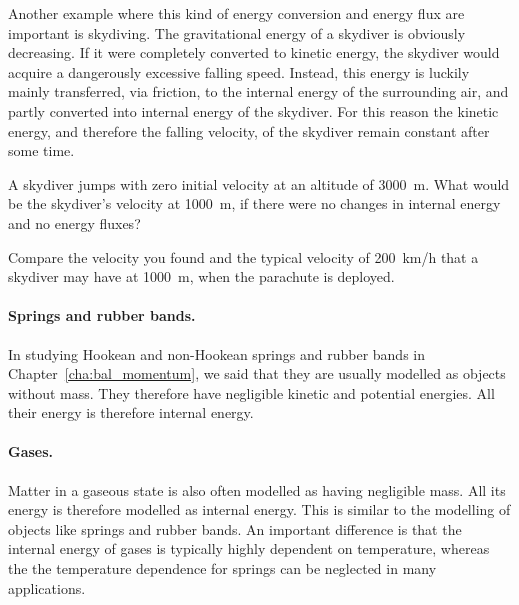 \documentclass[a4paper,12pt,%
onecolumn,oneside,%
british%
]{memoir}
\renewcommand*{\|}[1][]{\nonscript\:#1\vert\nonscript\:\mathopen{}}
\newcommand*{\chap}{Chapter}%
\begin{document}
Another example where this kind of energy conversion and energy flux are important is skydiving. The gravitational energy of a skydiver is obviously decreasing. If it were completely converted to kinetic energy, the skydiver would acquire a dangerously excessive falling speed. Instead, this energy is luckily mainly transferred, via friction, to the internal energy of the surrounding air, and partly converted into internal energy of the skydiver. For this reason the kinetic energy, and therefore the falling velocity, of the skydiver remain constant after some time.
%
%

\begin{exercise}
  A skydiver jumps with zero initial velocity at an altitude of \qty{3000}{m}. What would be the skydiver's velocity at \qty{1000}{m}, if there were no changes in internal energy and no energy fluxes?

  Compare the velocity you found and the typical velocity of \qty{200}{km/h} that a skydiver may have at \qty{1000}{m}, when the parachute is deployed.
\end{exercise}

\paragraph{Springs and rubber bands.}

In studying Hookean and non-Hookean springs and rubber bands in \chap~\ref{cha:bal_momentum}, we said that they are usually modelled as objects without mass. They therefore have negligible kinetic and potential energies. All their energy is therefore internal energy.

\paragraph{Gases.}
Matter in a gaseous state is also often modelled as having negligible mass. All its energy is therefore modelled as internal energy. This is similar to the modelling of objects like springs and rubber bands. An important difference is that the internal energy of gases is typically highly dependent on temperature, whereas the the temperature dependence for springs can be neglected in many applications.
\end{document}

